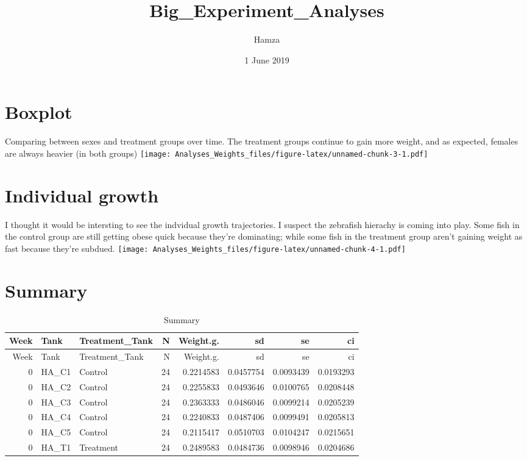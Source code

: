 \documentclass[]{article}
\title{Big\_Experiment\_Analyses}
\author{Hamza}
\date{1 June 2019}
\begin{document}
\maketitle

\section{Boxplot}\label{boxplot}

Comparing between sexes and treatment groups over time. The treatment
groups continue to gain more weight, and as expected, females are always
heavier (in both groups)
\texttt{[image: Analyses\_Weights\_files/figure-latex/unnamed-chunk-3-1.pdf]}

\section{Individual growth}\label{individual-growth}

I thought it would be intersting to see the indvidual growth
trajectories. I suspect the zebrafish hierachy is coming into play. Some
fish in the control group are still getting obese quick because they're
dominating; while some fish in the treatment group aren't gaining weight
as fast because they're subdued.
\texttt{[image: Analyses\_Weights\_files/figure-latex/unnamed-chunk-4-1.pdf]}

\section{Summary}\label{summary}

\begin{longtable}[]{@{}rllrrrrr@{}}
\caption{Summary}\tabularnewline
\toprule
Week & Tank & Treatment\_Tank & N & Weight.g. & sd & se &
ci\tabularnewline
\midrule
\endfirsthead
\toprule
Week & Tank & Treatment\_Tank & N & Weight.g. & sd & se &
ci\tabularnewline
\midrule
\endhead
0 & HA\_C1 & Control & 24 & 0.2214583 & 0.0457754 & 0.0093439 &
0.0193293\tabularnewline
0 & HA\_C2 & Control & 24 & 0.2255833 & 0.0493646 & 0.0100765 &
0.0208448\tabularnewline
0 & HA\_C3 & Control & 24 & 0.2363333 & 0.0486046 & 0.0099214 &
0.0205239\tabularnewline
0 & HA\_C4 & Control & 24 & 0.2240833 & 0.0487406 & 0.0099491 &
0.0205813\tabularnewline
0 & HA\_C5 & Control & 24 & 0.2115417 & 0.0510703 & 0.0104247 &
0.0215651\tabularnewline
0 & HA\_T1 & Treatment & 24 & 0.2489583 & 0.0484736 & 0.0098946 &
0.0204686\tabularnewline
\bottomrule
\end{longtable}
\end{document}
